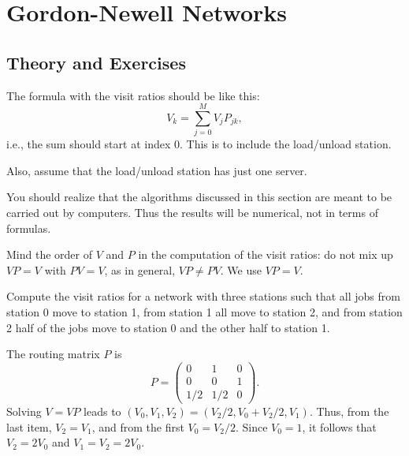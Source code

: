 
\section{Gordon-Newell Networks}
\label{sec:gordonNewell}


\subsection*{Theory and Exercises}



The formula with the visit ratios should be like this:
\begin{equation*}
  V_k = \sum_{j=0}^M V_j P_{jk}, 
\end{equation*}
i.e., the sum should start at index 0. This is to include the
load/unload station.

Also, assume that the load/unload station has just one server.


You should realize that the algorithms discussed in this section are
meant to be carried out by computers. Thus the results will be
numerical, not in terms of formulas.

Mind the order of $V$ and $P$ in the computation of the visit ratios:
do not mix up $VP=V$ with $P V=V$, as in general, $VP \neq P V$.  We use
$VP=V$.


\begin{exercise}\label{ex:mva}
  Compute the visit ratios for a network with three stations such that all jobs from station 0 move to station 1, from station 1 all move to station 2, and from station 2 half of the jobs move to station 0 and the other half to station 1. 
  \begin{solution}
    The routing matrix $P$ is
    \begin{equation*}
      P = 
      \begin{pmatrix}
        0 & 1 & 0 \\
0& 0 & 1 \\
1/2 & 1/2 & 0
      \end{pmatrix}.
    \end{equation*}
    Solving $V=VP$ leads to
    $(V_0, V_1, V_2) = (V_2/2, V_0 + V_2/2, V_1)$. Thus, from the last
    item, $V_2 = V_1$, and from the first $V_0 = V_2/2$. Since
    $V_0=1$, it follows that $V_2 = 2V_0$ and $V_1=V_2=2 V_0$.
  \end{solution}
\end{exercise}

